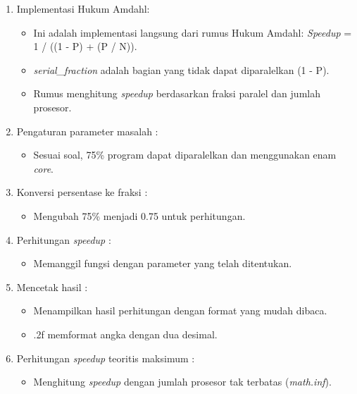 \documentclass[12pt]{article}
\begin{document}
\begin{enumerate}
\begin{enumerate}
        \item Implementasi Hukum Amdahl:
            \begin{itemize}
                \item Ini adalah implementasi langsung dari rumus Hukum Amdahl: \textit{Speedup} = 1 / ((1 - P) + (P / N)).
                
                \item \textit{serial\_fraction} adalah bagian yang tidak dapat diparalelkan (1 - P).
                
                \item Rumus menghitung \textit{speedup} berdasarkan fraksi paralel dan jumlah prosesor.
            \end{itemize}
            
        \item Pengaturan parameter masalah :
            \begin{itemize}
                \item Sesuai soal, 75\% program dapat diparalelkan dan menggunakan enam \textit{core}.
            \end{itemize}
            
        \item Konversi persentase ke fraksi :
            \begin{itemize}
                \item Mengubah 75\% menjadi 0.75 untuk perhitungan.
            \end{itemize}
            
        \item Perhitungan \textit{speedup} :
            \begin{itemize}
                \item Memanggil fungsi dengan parameter yang telah ditentukan.
            \end{itemize}
            
        \item  Mencetak hasil :
            \begin{itemize}
                \item Menampilkan hasil perhitungan dengan format yang mudah dibaca.
                \item .2f memformat angka dengan dua desimal.
            \end{itemize}
            
        \item  Perhitungan \textit{speedup} teoritis maksimum :
            \begin{itemize}
                \item Menghitung \textit{speedup} dengan jumlah prosesor tak terbatas (\textit{math.inf}).
                

\end{itemize}
\end{enumerate}
\end{enumerate}
\end{document}
